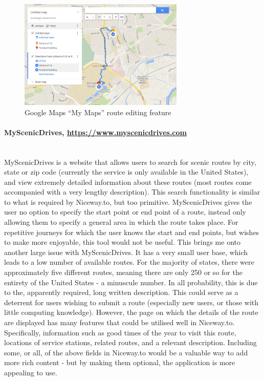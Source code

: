 \documentclass[a4paper,twoside,notitlepage,11pt]{article}
\begin{document}
\begin{figure}[!ht]
\begin{center}
\includegraphics[width=0.7\textwidth]{images/google_maps.png}
\end{center}
\vspace{-6mm}
\caption{Google Maps ``My Maps'' route editing feature}
\vspace{-6mm}
\end{figure}

\paragraph{MyScenicDrives, \url{https://www.myscenicdrives.com}}\ \\
MyScenicDrives is a website that allows users to search for scenic routes by city, state or zip code (currently the service is only available in the United States), and view extremely detailed information about these routes (most routes come accompanied with a very lengthy description). This search functionality is similar to what is required by Niceway.to, but too primitive. MyScenicDrives gives the user no option to specify the start point or end point of a route, instead only allowing them to specify a general area in which the route takes place. For repetitive journeys for which the user knows the start and end points, but wishes to make more enjoyable, this tool would not be useful. This brings me onto another large issue with MyScenicDrives. It has a very small user base, which leads to a low number of available routes. For the majority of states, there were approximately five different routes, meaning there are only 250 or so for the entirety of the United States - a minuscule number. In all probability, this is due to the, apparently required, long written description. This could serve as a deterrent for users wishing to submit a route (especially new users, or those with little computing knowledge). However, the page on which the details of the route are displayed has many features that could be utilised well in Niceway.to. Specifically, information such as good times of the year to visit this route, locations of service stations, related routes, and a relevant description. Including some, or all, of the above fields in Niceway.to would be a valuable way to add more rich content - but by making them optional, the application is more appealing to use. 
\end{document}
